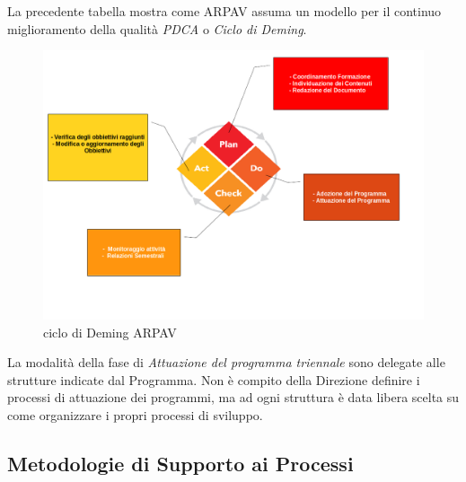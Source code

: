 La precedente tabella mostra come ARPAV assuma un modello per il continuo miglioramento della qualità \textit{PDCA} o \textit{Ciclo di Deming}.

\begin{figure}[htpb]


\includegraphics[scale=0.5]{./capitoli/capitolo1/img/demming}
\caption{ciclo di Deming ARPAV}
\end{figure}

La modalità della fase di \textit{Attuazione del programma triennale} sono delegate alle strutture indicate dal Programma. Non è compito della Direzione definire i processi di attuazione dei programmi, ma ad ogni struttura è data libera scelta su come organizzare i propri processi di sviluppo. \\

\subsection{Metodologie di Supporto ai Processi}


